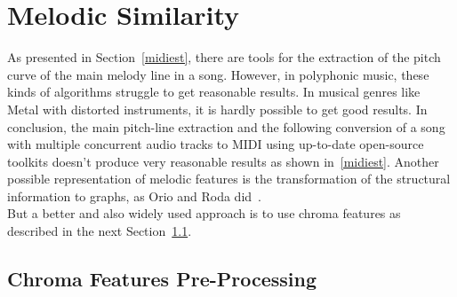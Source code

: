 \section{Melodic Similarity}\label{melsimc}

As presented in Section~\ref{midiest}, there are tools for the extraction of the pitch curve of the main melody line in a song. However, in polyphonic music, these kinds of algorithms struggle to get reasonable results. %
In musical genres like Metal with distorted instruments, it is hardly possible to get good results. 
In conclusion, the main pitch-line extraction and the following conversion of a song with multiple concurrent audio tracks to MIDI using up-to-date open-source toolkits doesn't produce very reasonable results as shown in~\ref{midiest}.
Another possible representation of melodic features is the transformation of the structural information to graphs, as Orio and Roda did~\cite{graph1}.\\ 
But a better and also widely used approach is to use chroma features as described in the next Section~\ref{chromafeat}.

\subsection{Chroma Features Pre-Processing}\label{chromafeat}


